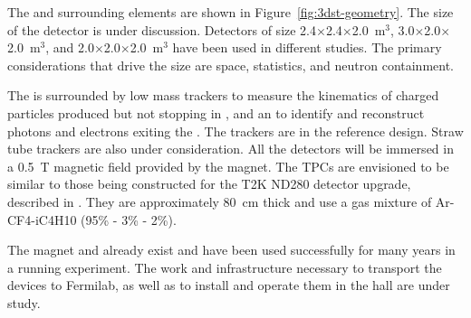 The  and surrounding elements are shown in Figure~\ref{fig:3dst-geometry}.  The size of the  detector is under discussion.  Detectors of size 2.4$\times$2.4$\times$2.0~m$^{3}$, 3.0$\times$2.0$\times$2.0~m$^{3}$, and 2.0$\times$2.0$\times$2.0~m$^{3}$ have been used in different studies.  The primary considerations that drive the size are space, statistics, and neutron containment.

The  is surrounded by low mass trackers to measure the kinematics of charged particles produced but not stopping in , and an  to identify and reconstruct photons and electrons exiting the . The trackers are  in the reference design.  Straw tube trackers are also under consideration.  All the detectors will be immersed in a 0.5~T magnetic field provided by the  magnet. The TPCs are envisioned to be similar to those being constructed for the T2K ND280 detector upgrade, described in \cite{Abe:2019whr}.  They are approximately 80~cm thick and use a gas mixture of Ar-CF4-iC4H10 (95\% - 3\% - 2\%).  %

The  magnet and  already exist and have been used successfully for many years in a running experiment. The work and infrastructure necessary to transport the devices to Fermilab, as well as to install and operate them in the  hall are under study.






